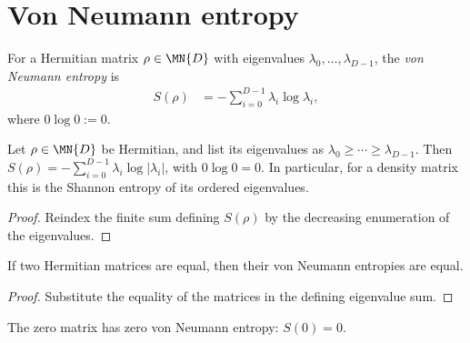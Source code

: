 \section{Von Neumann entropy}

\begin{definition}\label{def:von_neumann_entropy}
    \leanok
    For a Hermitian matrix $\rho\in\MN{D}$ with eigenvalues
    $\lambda_0,\ldots,\lambda_{D-1}$, the \emph{von Neumann entropy} is
    \begin{align}
        S(\rho)
         & =-\sum_{i=0}^{D-1}\lambda_i\log\lambda_i,
        \label{eq:entropy_definition}
    \end{align}
    where $0\log 0:=0$.
\end{definition}

\begin{theorem}
    \label{thm:entropy_ordered_eigenvalues}
    \leanok
    Let $\rho\in\MN{D}$ be Hermitian, and list its eigenvalues as
    $\lambda_0\ge\cdots\ge\lambda_{D-1}$. Then
    $S(\rho)=-\sum_{i=0}^{D-1}\lambda_i\log|\lambda_i|$, with $0\log 0=0$.
    In particular, for a density matrix this is the Shannon entropy of its
    ordered eigenvalues.
\end{theorem}

\begin{proof}\leanok
    Reindex the finite sum defining $S(\rho)$ by the decreasing enumeration
    of the eigenvalues.
\end{proof}

\begin{lemma}\label{lem:entropy_congr}
    \leanok
    If two Hermitian matrices are equal, then their von Neumann entropies are
    equal.
\end{lemma}

\begin{proof}\leanok
    Substitute the equality of the matrices in the defining eigenvalue sum.
\end{proof}

\begin{lemma}\label{lem:entropy_zero}
    \leanok
    The zero matrix has zero von Neumann entropy: $S(0)=0$.
\end{lemma}


